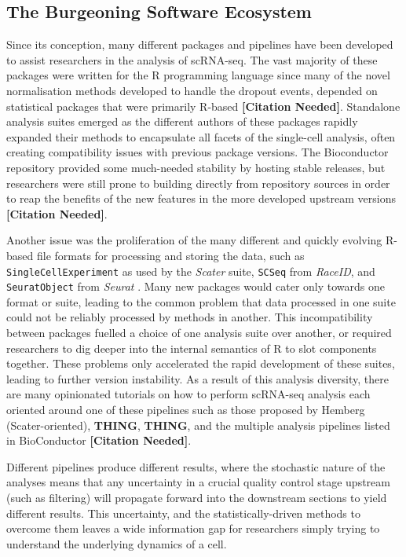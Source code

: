 \documentclass[a4paper,num-refs]{oup-contemporary}
\newcommand{\prog}[1]{\textit{#1}}
\newcommand{\fileformat}[1]{\texttt{#1}}
\newcommand{\citeneed}{{\bf\tiny [Citation Needed]}}
\newcommand{\thing}{{\bf THING}}
\begin{document}
\subsection{The Burgeoning Software Ecosystem}

Since its conception, many different packages and pipelines have been developed to assist researchers in the analysis of scRNA-seq. The vast majority of these packages were written for the R programming language since many of the novel normalisation methods developed to handle the dropout events, depended on statistical packages that were primarily R-based \citeneed. Standalone analysis suites emerged as the different authors of these packages rapidly expanded their methods to encapsulate all facets of the single-cell analysis, often creating compatibility issues with previous package versions. The Bioconductor repository provided some much-needed stability by hosting stable releases, but researchers were still prone to building directly from repository sources in order to reap the benefits of the new features in the more developed upstream versions \citeneed.

Another issue was the proliferation of the many different and quickly evolving R-based file formats for processing and storing the data, such as \fileformat{SingleCellExperiment} as used by the \prog{Scater} suite, \fileformat{SCSeq} from \prog{RaceID}, and \fileformat{SeuratObject} from \prog{Seurat} \citep{lun2018singlecellexperiment,mccarthy2017scater,grun2015raceid,satija2015seurat}.
Many new packages would cater only towards one format or suite, leading to the common problem that data processed in one suite could not be reliably processed by methods in another. This incompatibility between packages fuelled a choice of one analysis suite over another, or required researchers to dig deeper into the internal semantics of R to slot components together. These problems only accelerated the rapid development of these suites, leading to further version instability. As a result of this analysis diversity, there are many opinionated tutorials on how to perform scRNA-seq analysis each oriented around one of these pipelines such as those proposed by Hemberg (Scater-oriented), \thing, \thing, and the multiple analysis pipelines listed in BioConductor \citeneed.

Different pipelines produce different results, where the stochastic nature of the analyses means that any uncertainty in a crucial quality control stage upstream (such as filtering) will propagate forward into the downstream sections to yield different results. This uncertainty, and the statistically-driven methods to overcome them leaves a wide information gap for researchers simply trying to understand the underlying dynamics of a cell.
\end{document}
